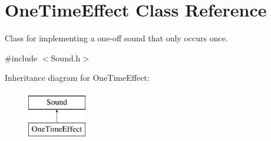 \hypertarget{class_one_time_effect}{}\section{One\+Time\+Effect Class Reference}
\label{class_one_time_effect}


Class for implementing a one-\/off sound that only occurs once.  




{\ttfamily \#include $<$Sound.\+h$>$}

Inheritance diagram for One\+Time\+Effect\+:\begin{figure}[H]
\begin{center}
\leavevmode
\includegraphics[height=2.000000cm]{class_one_time_effect}
\end{center}
\end{figure}
